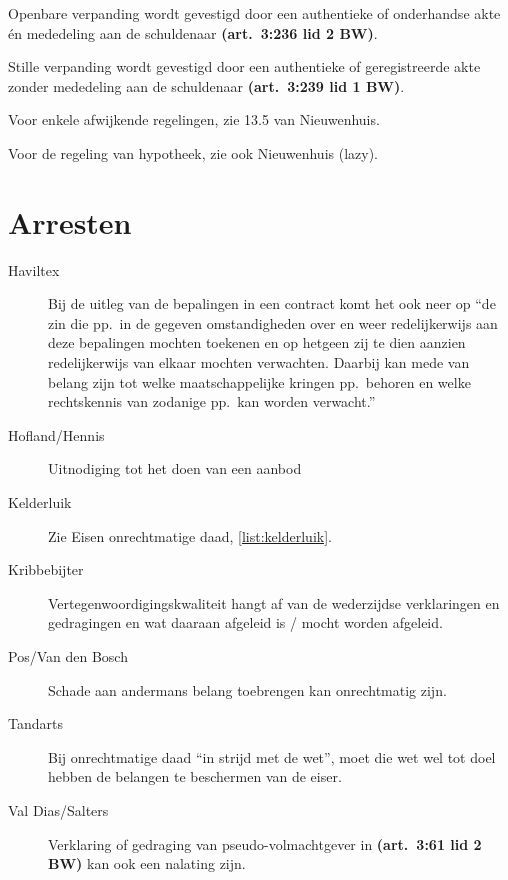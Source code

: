 \documentclass[a4paper]{article}
\newcommand{\art}[1]{\textbf{(art.~#1 BW)}\xspace}
\begin{document}
Openbare verpanding wordt gevestigd door een authentieke of onderhandse akte
\'en mededeling aan de schuldenaar \art{3:236 lid 2}.

Stille verpanding wordt gevestigd door een authentieke of geregistreerde akte
zonder mededeling aan de schuldenaar \art{3:239 lid 1}.

Voor enkele afwijkende regelingen, zie 13.5 van Nieuwenhuis.

Voor de regeling van hypotheek, zie ook Nieuwenhuis (lazy).

\section{Arresten}

\begin{description}

  \item[Haviltex] Bij de uitleg van de bepalingen in een contract komt het ook
    neer op ``de zin die pp.~in de gegeven omstandigheden over en weer
    redelijkerwijs aan deze bepalingen mochten toekenen en op hetgeen zij te
    dien aanzien redelijkerwijs van elkaar mochten verwachten. Daarbij kan
    mede van belang zijn tot welke maatschappelijke kringen pp.~behoren en
    welke rechtskennis van zodanige pp.~kan worden verwacht.''

  \item[Hofland/Hennis] Uitnodiging tot het doen van een aanbod

  \item[Kelderluik] Zie Eisen onrechtmatige daad, \ref{list:kelderluik}.

  \item[Kribbebijter] Vertegenwoordigingskwaliteit hangt af van de wederzijdse
    verklaringen en gedragingen en wat daaraan afgeleid is / mocht worden
    afgeleid.

  \item[Pos/Van den Bosch] Schade aan andermans belang toebrengen kan
    onrechtmatig zijn.

  \item[Tandarts] Bij onrechtmatige daad ``in strijd met de wet'', moet die
    wet wel tot doel hebben de belangen te beschermen van de eiser.

  \item[Val Dias/Salters] Verklaring of gedraging van pseudo-volmachtgever in
    \art{3:61 lid 2} kan ook een nalating zijn.

\end{description}
\end{document}
